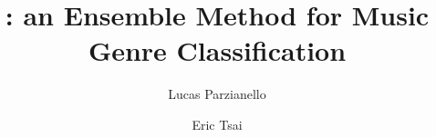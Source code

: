 \title[\name -- Ensemble Music Genre Classification]{\name: an Ensemble Method for Music Genre Classification}

\setreviewson


\author{Lucas Parzianello}


\author{Eric Tsai}

\renewcommand{\shortauthors}{Parzianello and Tsai}



